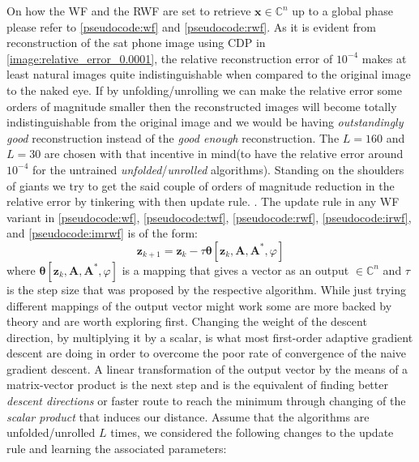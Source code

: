 On how the \ac{WF}\cite{Candes2014} and the \ac{RWF}\cite{Zhang2016} are set to retrieve $\boldsymbol{x} \in \mathbb{C}^n$ up to a global phase 
please refer to \cref{pseudocode:wf} and \cref{pseudocode:rwf}. As it is evident from reconstruction of the sat phone image 
using \ac{CDP} in \cref{image:relative_error_0.0001}, the relative reconstruction error of $10^{-4}$ 
makes at least natural images quite indistinguishable when compared to the original image to the naked eye. If by unfolding/unrolling we can make 
the relative error some orders of magnitude smaller then the reconstructed images will become totally indistinguishable from the original image 
and we would be having \emph{outstandingly good} reconstruction instead of the \emph{good enough} reconstruction. The 
$L=160$ and $L=30$ are chosen with that incentive in mind(to have the relative error around $10^{-4}$ for the untrained \emph{unfolded}/\emph{unrolled} 
algorithms). Standing on the shoulders of giants \cite{Gregor2010} we try to get the said couple of orders of magnitude reduction in the relative 
error by tinkering with then update rule. 
\cite{Gregor2010}. The update rule in any \ac{WF}\cite{Liu2019}\cite{Jaganathan2015} variant in \cref{pseudocode:wf}, \ref{pseudocode:twf}, \ref{pseudocode:rwf}, \ref{pseudocode:irwf}, and \ref{pseudocode:imrwf} is of the form:
\begin{equation*}
  \boldsymbol{z}_{k+1} = \boldsymbol{z}_k - \tau\boldsymbol{\theta}[\boldsymbol{z}_k,\boldsymbol{A},\boldsymbol{A^*},\varphi]
\end{equation*}
where $\boldsymbol{\theta}[\boldsymbol{z}_k,\boldsymbol{A},\boldsymbol{A^*},\varphi]$ is a mapping that gives a vector as an output 
$\in\mathbb{C}^n$ and $\tau$ is the step size that was proposed by the respective algorithm. While just trying different mappings of the output vector might work 
some are more backed by theory and are worth exploring first. Changing the weight of the descent direction, by multiplying it by a scalar, is what most first-order adaptive gradient descent are doing in order to 
overcome the poor rate of convergence of the naive gradient descent. A linear transformation of the output vector by the means of a matrix-vector product is the next step 
and is the equivalent of finding better \emph{descent directions} or faster route to reach the minimum through changing of the \emph{scalar product} that induces our distance.
Assume that the algorithms are unfolded/unrolled $L$ times, 
we considered the following changes to the update rule and learning the associated parameters: 

